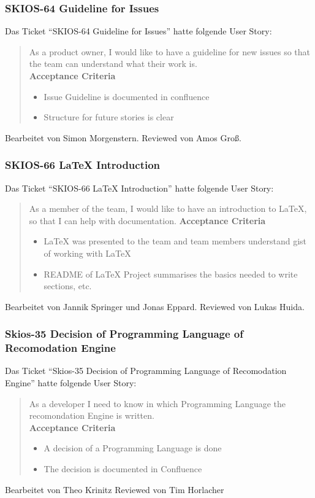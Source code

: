 \subsubsection{SKIOS-64 Guideline for Issues}
Das Ticket \enquote{SKIOS-64 Guideline for Issues} hatte folgende User Story:
\begin{quotation}
    As a product owner, I would like to have a guideline for new issues so that the team can understand what their work is. \\
\textbf{Acceptance Criteria}
\begin{itemize}
    \item Issue Guideline is documented in confluence
    \item Structure for future stories is clear
\end{itemize}
\end{quotation}
Bearbeitet von Simon Morgenstern.
Reviewed von Amos Groß.

\subsubsection{SKIOS-66 LaTeX Introduction}
Das Ticket \enquote{SKIOS-66 LaTeX Introduction} hatte folgende User Story:
\begin{quotation}
    As a member of the team, I would like to have an introduction to LaTeX, so that I can help with documentation.
\textbf{Acceptance Criteria}
\begin{itemize}
    \item LaTeX was presented to the team and team members understand gist of working with LaTeX
    \item README of LaTeX Project summarises the basics needed to write sections, etc.
\end{itemize}
\end{quotation}
Bearbeitet von Jannik Springer und Jonas Eppard.
Reviewed von Lukas Huida.

\subsubsection{Skios-35 Decision of Programming Language of Recomodation Engine}
Das Ticket \enquote{Skios-35 Decision of Programming Language of Recomodation Engine} hatte folgende User Story:
\begin{quotation}
    As a developer I need to know in which Programming Language the recomondation Engine is written. \\
    \textbf{Acceptance Criteria}
    \begin{itemize}
        \item A decision of a Programming Language is done
        \item The decision is documented in Confluence
    \end{itemize}    
\end{quotation}
Bearbeitet von Theo Krinitz
Reviewed von Tim Horlacher 

